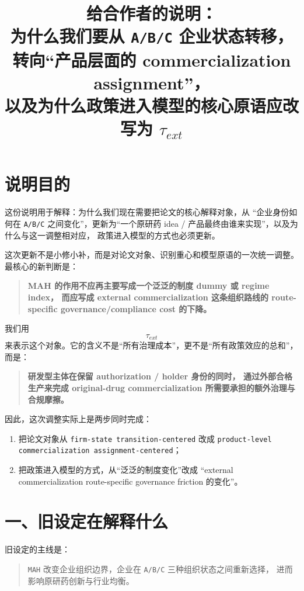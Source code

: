 \documentclass[12pt]{ctexart}
\title{给合作者的说明：\\
为什么我们要从 \texttt{A/B/C} 企业状态转移，转向“产品层面的 commercialization assignment”，\\
以及为什么政策进入模型的核心原语应改写为 \texorpdfstring{$\tau_{ext}$}{tau\_ext}
}
\author{}
\date{}
\begin{document}
\maketitle

\section*{说明目的}

这份说明用于解释：为什么我们现在需要把论文的核心解释对象，从
“企业身份如何在 \texttt{A/B/C} 之间变化”，更新为“一个原研药
idea / 产品最终由谁来实现”，以及为什么与这一调整相对应，
政策进入模型的方式也必须更新。

这次更新不是小修小补，而是对论文对象、识别重心和模型原语的一次统一调整。
最核心的新判断是：

\begin{quote}
\textbf{MAH 的作用不应再主要写成一个泛泛的制度 dummy 或 regime index，
而应写成 external commercialization 这条组织路线的
route-specific governance/compliance cost 的下降。}
\end{quote}

我们用
\[
\tau_{ext}
\]
来表示这个对象。它的含义不是“所有治理成本”，更不是“所有政策效应的总和”，
而是：

\begin{quote}
\textbf{研发型主体在保留 authorization / holder 身份的同时，
通过外部合格生产来完成 original-drug commercialization 所需要承担的额外治理与合规摩擦。}
\end{quote}

因此，这次调整实际上是两步同时完成：

\begin{enumerate}[leftmargin=2em]
    \item 把论文对象从 \texttt{firm-state transition-centered} 改成
    \texttt{product-level commercialization assignment-centered}；
    \item 把政策进入模型的方式，从“泛泛的制度变化”改成
    “external commercialization route-specific governance friction 的变化”。
\end{enumerate}

\section{一、旧设定在解释什么}

旧设定的主线是：

\begin{quote}
\texttt{MAH} 改变企业组织边界，企业在 \texttt{A/B/C} 三种组织状态之间重新选择，
进而影响原研药创新与行业均衡。
\end{quote}
\end{document}
